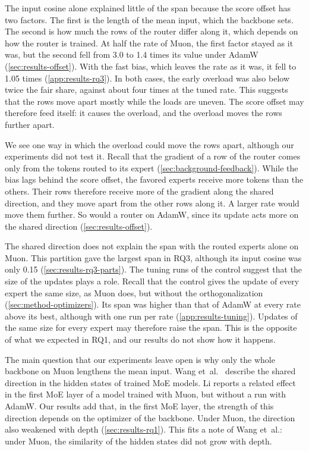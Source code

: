 The input cosine alone explained little of the span because the score offset has two factors. The first is the length of the mean input, which the backbone sets. The second is how much the rows of the router differ along it, which depends on how the router is trained. At half the rate of Muon, the first factor stayed as it was, but the second fell from 3.0 to 1.4 times its value under AdamW (\cref{sec:results-offset}). With the fast bias, which leaves the rate as it was, it fell to 1.05 times (\cref{app:results-rq3}). In both cases, the early overload was also below twice the fair share, against about four times at the tuned rate. This suggests that the rows move apart mostly while the loads are uneven. The score offset may therefore feed itself: it causes the overload, and the overload moves the rows further apart.

We see one way in which the overload could move the rows apart, although our experiments did not test it. Recall that the gradient of a row of the router comes only from the tokens routed to its expert (\cref{sec:background-feedback}). While the bias lags behind the score offset, the favored experts receive more tokens than the others. Their rows therefore receive more of the gradient along the shared direction, and they move apart from the other rows along it. A larger rate would move them further. So would a router on AdamW, since its update acts more on the shared direction (\cref{sec:results-offset}).

The shared direction does not explain the span with the routed experts alone on Muon. This partition gave the largest span in RQ3, although its input cosine was only 0.15 (\cref{sec:results-rq3-parts}). The tuning runs of the control suggest that the size of the updates plays a role. Recall that the control gives the update of every expert the same size, as Muon does, but without the orthogonalization (\cref{sec:method-optimizers}). Its span was higher than that of AdamW at every rate above its best, although with one run per rate (\cref{app:results-tuning}). Updates of the same size for every expert may therefore raise the span. This is the opposite of what we expected in RQ1, and our results do not show how it happens.

The main question that our experiments leave open is why only the whole backbone on Muon lengthens the mean input. Wang et~al.~\cite{wang2026myth} describe the shared direction in the hidden states of trained MoE models. Li \cite{li2026spectralcap} reports a related effect in the first MoE layer of a model trained with Muon, but without a run with AdamW\@. Our results add that, in the first MoE layer, the strength of this direction depends on the optimizer of the backbone. Under Muon, the direction also weakened with depth (\cref{sec:results-rq1}). This fits a note of Wang et~al.: under Muon, the similarity of the hidden states did not grow with depth.

